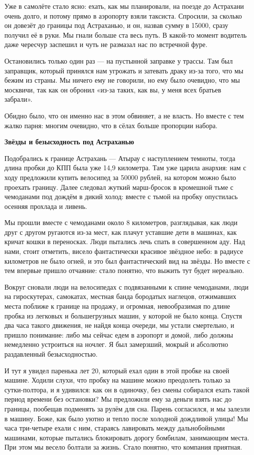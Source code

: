 Уже в самолёте стало ясно: ехать, как мы планировали, на поезде до Астрахани очень долго, и потому прямо в аэропорту взяли таксиста. Спросили, за сколько он довезёт до границы под Астраханью, и он, назвав сумму в 15000, сразу получил её в руки. Мы гнали больше ста весь путь. В какой-то момент водитель даже чересчур заспешил и чуть не размазал нас по встречной фуре.

Остановились только один раз — на пустынной заправке у трассы. Там был заправщик, который принялся нам угрожать и затевать драку из-за того, что мы бежим из страны. Мы ничего ему не говорили, но ему было очевидно, что мы москвичи, так как он обронил «из-за таких, как вы, у меня всех братьев забрали».

Обидно было, что он именно нас в этом обвиняет, а не власть. Но вместе с тем жалко парня: многим очевидно, что в сёлах больше пропорции набора.


\textbf{Звёзды и безысходность под Астраханью}

Подобрались к границе Астрахань — Атырау с наступлением темноты, тогда длина пробки до КПП была уже 14,9 километра. Там уже царила анархия: нам с ходу предложили купить велосипед за 50000 рублей, на котором можно было проехать границу. Далее следовал жуткий марш-бросок в кромешной тьме с чемоданами под дождём в дикий холод: вместе с тьмой на пробку опустилась осенняя прохлада и ливень.

Мы прошли вместе с чемоданами около 8 километров, разглядывая, как люди друг с другом ругаются из-за мест, как плачут уставшие дети в машинах, как кричат кошки в переносках. Люди пытались лечь спать в совершенном аду. Над нами, стоит отметить, висело фантастически красивое звёздное небо: в радиусе километров не было огней, и это был фантастический вид на звёзды. Но вместе с тем впервые пришло отчаяние: стало понятно, что выжить тут будет нереально.

Вокруг сновали люди на велосипедах с подвязанными к спине чемоданами, люди на гироскутерах, самокатах, местная банда бородатых наглецов, отжимавших места поближе к границе на продажу, и огромная, невообразимая по длине пробка из легковых и большегрузных машин, у которой не было конца. Спустя два часа такого движения, не найдя конца очереди, мы устали смертельно, и пришло понимание: либо мы сейчас едем в аэропорт и домой, либо должны немедленно устроиться на ночлег. Я был замерзший, мокрый и абсолютно раздавленный безысходностью.

И тут я увидел паренька лет 20, который ехал один в этой пробке на своей машине. Ходили слухи, что пробку на машине можно преодолеть только за сутки-полтора, и я удивился: как он в одиночку, без смены собирался ехать такой период времени без остановки? Мы предложили ему за деньги взять нас до границы, пообещав подменять за рулём для сна. Парень согласился, и мы залезли в машину. Боже, как было уютно и тепло после холодной дождливой улицы! Мы часа три-четыре ехали с ним, стараясь лавировать между дальнобойными машинами, которые пытались блокировать дорогу бомбилам, занимающим места. При этом мы весело болтали за жизнь. Стало понятно, что компания приятная.

